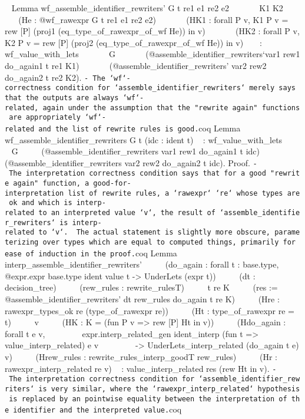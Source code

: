 \begin{itemize}
  ~ Lemma wf\_assemble\_identifier\_rewriters' G t re1 e1 re2 e2 ~ ~ ~ ~
  K1 K2 ~ ~ ~ ~ (He : @wf\_rawexpr G t re1 e1 re2 e2) ~ ~ ~ ~ (HK1 :
  forall P v, K1 P v = rew {[}P{]} (proj1 (eq\_type\_of\_rawexpr\_of\_wf
  He)) in v) ~ ~ ~ ~ (HK2 : forall P v, K2 P v = rew {[}P{]} (proj2
  (eq\_type\_of\_rawexpr\_of\_wf He)) in v) ~ ~ : wf\_value\_with\_lets
  ~ ~ ~ ~ G ~ ~ ~ ~ (@assemble\_identifier\_rewriters`var1 rew1
  do\_again1 t re1 K1) ~ ~ ~ ~ (@assemble\_identifier\_rewriters' var2
  rew2 do\_again2 t re2 K2).
  \texttt{-\ The\ `wf`-correctness\ condition\ for\ `assemble\_identifier\_rewriters`\ merely\ says\ that\ the\ outputs\ are\ always\ `wf`-related,\ again\ under\ the\ assumption\ that\ the\ "rewrite\ again"\ functions\ are\ appropriately\ `wf`-related\ and\ the\ list\ of\ rewrite\ rules\ is\ good.}coq
  Lemma wf\_assemble\_identifier\_rewriters G t (idc : ident t) ~ :
  wf\_value\_with\_lets ~ ~ ~ G ~ ~ ~ (@assemble\_identifier\_rewriters
  var1 rew1 do\_again1 t idc) ~ ~ ~ (@assemble\_identifier\_rewriters
  var2 rew2 do\_again2 t idc). Proof.
  \texttt{-\ The\ interpretation\ correctness\ condition\ says\ that\ for\ a\ good\ "rewrite\ again"\ function,\ a\ good-for-interpretation\ list\ of\ rewrite\ rules,\ a\ `rawexpr`\ `re`\ whose\ types\ are\ ok\ and\ which\ is\ interp-related\ to\ an\ interpreted\ value\ `v`,\ the\ result\ of\ `assemble\_identifier\_rewriters\textquotesingle{}`\ is\ interp-related\ to\ `v`.\ \ The\ actual\ statement\ is\ slightly\ more\ obscure,\ parameterizing\ over\ types\ which\ are\ equal\ to\ computed\ things,\ primarily\ for\ ease\ of\ induction\ in\ the\ proof.}coq
  Lemma interp\_assemble\_identifier\_rewriters' ~ ~ ~ (do\_again :
  forall t : base.type, @expr.expr base.type ident value t
  -\textgreater{} UnderLets (expr t)) ~ ~ ~ (dt : decision\_tree) ~ ~ ~
  (rew\_rules : rewrite\_rulesT) ~ ~ ~ t re K ~ ~ ~ (res :=
  @assemble\_identifier\_rewriters' dt rew\_rules do\_again t re K) ~ ~
  ~ (Hre : rawexpr\_types\_ok re (type\_of\_rawexpr re)) ~ ~ ~ (Ht :
  type\_of\_rawexpr re = t) ~ ~ ~ v ~ ~ ~ (HK : K = (fun P v
  =\textgreater{} rew {[}P{]} Ht in v)) ~ ~ ~ (Hdo\_again : forall t e
  v, ~ ~ ~ ~ ~ expr.interp\_related\_gen ident\_interp (fun t
  =\textgreater{} value\_interp\_related) e v ~ ~ ~ ~ ~ -\textgreater{}
  UnderLets\_interp\_related (do\_again t e) v) ~ ~ ~ (Hrew\_rules :
  rewrite\_rules\_interp\_goodT rew\_rules) ~ ~ ~ (Hr :
  rawexpr\_interp\_related re v) ~ : value\_interp\_related res (rew Ht
  in v).
  \texttt{-\ The\ interpretation\ correctness\ condition\ for\ `assemble\_identifier\_rewriters`\ is\ very\ similar,\ where\ the\ `rawexpr\_interp\_related`\ hypothesis\ is\ replaced\ by\ an\ pointwise\ equality\ between\ the\ interpretation\ of\ the\ identifier\ and\ the\ interpreted\ value.}coq

\end{itemize}
